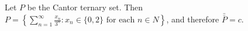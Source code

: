 Let $P$ be the Cantor ternary set. Then $P = \left\{ \sum_{n=1}^{\infty} \frac{x_n}{3^n} : x_n \in \{0, 2\} \text{ for each } n \in N \right\}$, and therefore $\bar{\bar{P}} = c$.
